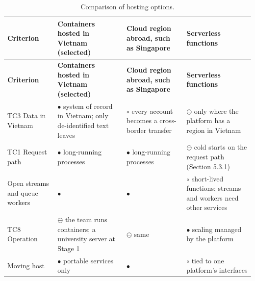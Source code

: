 {\small{}\renewcommand{\arraystretch}{1.1}
\begin{longtable}{|>{\raggedright\arraybackslash}p{}|>{\raggedright\arraybackslash}p{}|>{\raggedright\arraybackslash}p{}|>{\raggedright\arraybackslash}p{}|}
\caption{Comparison of hosting options.} \\
\hline
\textbf{Criterion} & \textbf{Containers hosted in Vietnam (selected)} & \textbf{Cloud region abroad, such as Singapore} & \textbf{Serverless functions} \\ \hline
\endfirsthead
\hline
\textbf{Criterion} & \textbf{Containers hosted in Vietnam (selected)} & \textbf{Cloud region abroad, such as Singapore} & \textbf{Serverless functions} \\ \hline
\endhead
TC3 Data in Vietnam & $\bullet$ system of record in Vietnam; only de-\allowbreak{}identified text leaves & $\circ$ every account becomes a cross-\allowbreak{}border transfer\cite{r99} & $\ominus$ only where the platform has a region in Vietnam \\ \hline
TC1 Request path & $\bullet$ long-\allowbreak{}running processes & $\bullet$ long-\allowbreak{}running processes & $\ominus$ cold starts on the request path (Section 5.3.1) \\ \hline
Open streams and queue workers & $\bullet$ & $\bullet$ & $\circ$ short-lived functions; streams and workers need other services \\ \hline
TC8 Operation & $\ominus$ the team runs containers; a university server at Stage 1 & $\ominus$ same & $\bullet$ scaling managed by the platform \\ \hline
Moving host & $\bullet$ portable services only & $\bullet$ & $\circ$ tied to one platform's interfaces \\ \hline
\end{longtable}
}

